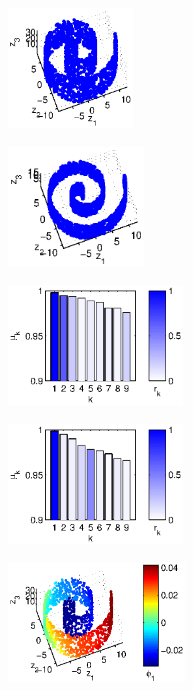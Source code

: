 \documentclass[preprint]{elsarticle}
\begin{document}
\begin{figure}[t]
%
\begin{subfigure}{0.45\textwidth}
\centering
\includegraphics[height=1.25in]{swissroll1}
\caption{}
\end{subfigure}
\hfill
\begin{subfigure}{0.45\textwidth}
\centering
\includegraphics[height=1.25in]{swissroll2}
\caption{}
\end{subfigure}
\hfill
\begin{subfigure}{0.45\textwidth}
\centering
\includegraphics[height=1.25in]{swissroll1_evals}
\caption{}
\end{subfigure}
\hfill
\begin{subfigure}{0.45\textwidth}
\centering
\includegraphics[height=1.25in]{swissroll2_evals}
\caption{}
\end{subfigure}
\hfill
\begin{subfigure}{0.45\textwidth}
\centering
\includegraphics[height=1.25in]{swissroll1_color1} 

\end{subfigure}
\end{figure}
\end{document}
